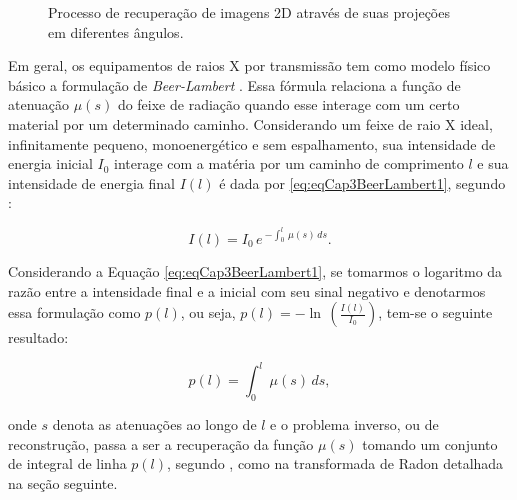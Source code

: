 
\begin{figure}[H]
	\centering
	
	\caption{Processo de recuperação de imagens 2D através de suas projeções em diferentes ângulos.}
	
	\hfil
	\hfil
	
	\label{fig:imgCap3ProbInver}
\end{figure}

Em geral, os equipamentos de raios X por transmissão tem como modelo físico básico a formulação de \textit{Beer-Lambert} \cite{zeng2010medical}. Essa fórmula relaciona a função de atenuação $\mu(s)$ do feixe de radiação quando esse interage com um certo material por um determinado caminho. Considerando um feixe de raio X ideal, infinitamente pequeno, monoenergético e sem espalhamento, sua intensidade de energia inicial $I_{0}$ interage com a matéria por um caminho de comprimento $l$ e sua intensidade de energia final $I(l)$ é dada por \eqref{eq:eqCap3BeerLambert1}, segundo :

\begin{equation}
 I(l) = I_{0} \, e \, ^{-\int_{0}^{l} \,\mu(s) \, ds}.
\label{eq:eqCap3BeerLambert1}
\end{equation}

Considerando a Equação \ref{eq:eqCap3BeerLambert1}, se tomarmos o logaritmo da razão entre a intensidade final e a inicial com seu sinal negativo e denotarmos essa formulação como $p(l)$, ou seja, $p(l) = -\ln \, \left(\frac{I(l)}{I_{0}}\right)$, tem-se o seguinte resultado:

\begin{equation}
p(l) = {\int_{0}^{l} \,\mu(s) \, ds},
\label{eq:eqCap3BeerLambert2}
\end{equation}

\noindent onde $s$ denota as atenuações ao longo de $l$ e o problema inverso, ou de reconstrução, passa a ser a recuperação da função  $\mu(s)$ tomando um conjunto de integral de linha $p(l)$, segundo , como na transformada de Radon detalhada na seção seguinte.  
 
